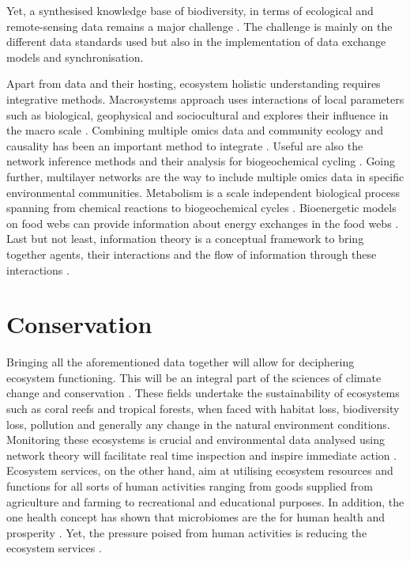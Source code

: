 Yet, a synthesised knowledge base of biodiversity, in terms of ecological and
remote-sensing data remains a major challenge \parencite{feng2022Review}. The challenge
is mainly on the different data standards used but also in the implementation of 
data exchange models and synchronisation.

Apart from data and their hosting, ecosystem holistic understanding requires
integrative methods. Macrosystems approach uses interactions of local parameters
such as biological, geophysical and sociocultural and explores their influence in
the macro scale \parencite{heffernan2014}. Combining multiple omics data and community ecology and causality has
been an important method to integrate \parencite{jurburg2022community}. Useful are also the network inference methods 
and their analysis for biogeochemical cycling \parencite{jameson2023Network}. Going further, multilayer networks \parencite{marine-multilayers}
are the way to include multiple omics data in specific environmental communities. 
Metabolism is a scale independent biological process spanning from chemical reactions
to biogeochemical cycles \parencite{hall2018understanding}. Bioenergetic models on food 
webs can provide information about energy exchanges in the food webs \parencite{valdovinos2023bioenergetic}.
Last but not least, information theory is a conceptual framework to bring together agents,
their interactions and the flow of information through these interactions \parencite{oconnor-information-ecology}.

\section{Conservation}
\label{sec:conservation}

Bringing all the aforementioned data together will allow for deciphering ecosystem functioning.
This will be an integral part of the sciences of climate change
and conservation \parencite{cavicchioli2019scientists}. These fields undertake the
sustainability of ecosystems such as coral reefs and tropical forests, when
faced with habitat loss, biodiversity loss, pollution and generally any change
in the natural environment conditions. Monitoring these ecosystems is crucial
and environmental data analysed using network theory will facilitate real time
inspection and inspire immediate action \parencite{derocles2018Biomonitoring}.
Ecosystem services, on the other hand, aim at utilising ecosystem resources
and functions for all sorts of human activities ranging from goods supplied
from agriculture and farming \parencite{alvarez-silva2017Compartmentalized} to
recreational and educational purposes. In addition, the one health concept has
shown that microbiomes are the for human health and prosperity
\parencite{banerjee2023Soil, lehmann2020concept}. Yet, the pressure poised from human activities
is reducing the ecosystem services \parencite{rillig2023Increasing}.

